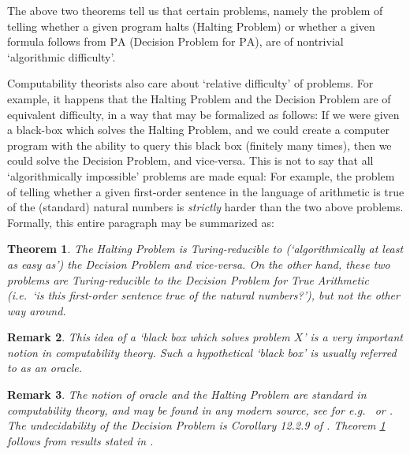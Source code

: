 \documentclass{article}
\newtheorem{theorem}{Theorem}[section]
\newtheorem{remark}[theorem]{Remark}
\theoremstyle{nonumberplain}
\begin{document}
The above two theorems tell us that certain problems, namely the problem of telling whether a given program halts (Halting Problem) or whether a given formula follows from $\mathrm{PA}$ (Decision Problem for $\mathrm{PA}$), are of nontrivial `algorithmic difficulty'.

Computability theorists also care about `relative difficulty' of problems. For example, it happens that the Halting Problem and the Decision Problem are of equivalent difficulty, in a way that may be formalized as follows: If we were given a black-box which solves the Halting Problem, and we could create a computer program with the ability to query this black box (finitely many times), then we could solve the Decision Problem, and vice-versa. This is not to say that all `algorithmically impossible' problems are made equal: For example, the problem of telling whether a given first-order sentence in the language of arithmetic is true of the (standard) natural numbers is \emph{strictly} harder than the two above problems. Formally, this entire paragraph may be summarized as:
\begin{theorem}\label{thm:reducibles}
The Halting Problem is Turing-reducible to (`algorithmically at least as easy as') the Decision Problem and vice-versa. On the other hand, these two problems are Turing-reducible to the Decision Problem for True Arithmetic (i.e.\ `is this first-order sentence true of the natural numbers?'), but not the other way around.
\end{theorem}

\begin{remark}\label{rmk:oracle}
This idea of a `black box which solves problem $X$' is a very important notion in computability theory. Such a hypothetical `black box' is usually referred to as an \emph{oracle}.
\end{remark}

\begin{remark}
The notion of oracle and the Halting Problem are standard in computability theory, and may be found in any modern source, see for e.g.\ \cite{soare1} or \cite{avigad}. The undecidability of the Decision Problem is Corollary 12.2.9 of \cite{avigad}. Theorem \ref{thm:reducibles} follows from results stated in \cite{two_theorems}.
\end{remark}
\end{document}

